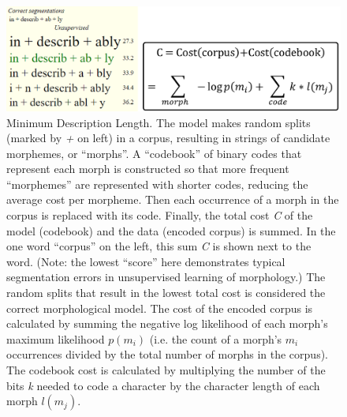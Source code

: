 \documentclass[12pt]{article}
\begin{document}
\begin{figure}[ht]
\label{fig:MDL}
\begin{center}
\includegraphics[width=0.9\columnwidth]{MDL2.PNG}
\caption{Minimum Description Length. The model makes random splits (marked by \textit{+} on left) in a corpus, resulting in strings of candidate morphemes, or ``morphs''. A ``codebook'' of binary codes that represent each morph is constructed so that more frequent ``morphemes'' are represented with shorter codes, reducing the average cost per morpheme. Then each occurrence of a morph in the corpus is replaced with its code. Finally, the total cost \textit{C} of the model (codebook) and the data (encoded corpus) is summed. In the one word ``corpus'' on the left, this sum \textit{C} is shown next to the word. (Note: the lowest ``score'' here demonstrates typical segmentation errors in unsupervised learning of morphology.) The random splits that result in the lowest total cost is considered the correct morphological model. The cost of the encoded corpus is calculated by summing the negative log likelihood of each morph's maximum likelihood \textit{$p(m_i)$} (i.e. the count of a morph's \textit{$m_i$} occurrences divided by the total number of morphs in the corpus). The codebook cost is calculated by multiplying the number of the bits \textit{k} needed to code a character by the character length of each morph \textit{$l(m_j)$}. }
\end{center}
\end{figure}
\end{document}

